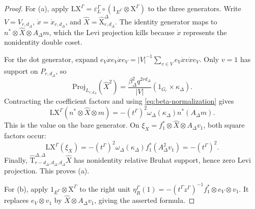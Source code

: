 \documentclass[12pt]{amsart}
\numberwithin{itemcounter}{subsection}
\theoremstyle{plain}
\theoremstyle{definition}
\theoremstyle{remark}
\numberwithin{equation}{section}
\def\LX{\mathrm{LX}}
\def\Proj{\mathrm{Proj}}
\begin{document}
\begin{proof}
For (a), apply
\(\LX^\Gamma=\varepsilon_L^\Gamma\circ(1_{E^\Gamma}\otimes\mathrm X^\Gamma)\)
to the three generators.  Write \(V=V_{r,d_\Delta}\),
\(\dot x=\dot x_{r,d_\Delta}\), and
\(\widehat X=\widehat{\mathrm X}^\Delta_{r,d_\Delta}\).
The identity generator maps to
\(n^*\otimes\widehat X\otimes A_\Delta m\), which the Levi projection
kills because \(\dot x\) represents the nonidentity double coset.

For the dot generator, expand
\(e_V\dot x e_V\dot x e_V
=|V|^{-1}\sum_{v\in V}e_V\dot x v\dot x e_V\).
Only \(v=1\) has support on \(P_{r,d_\Delta}\), so
\[
 \Proj_{L_{r,d_\Delta}}(\widehat X^2)
 =\frac{\beta_\Delta^2q^{2rd_\Delta}}{|V|}
       (1_{G_r}\times\kappa_\Delta).
\]
Contracting the coefficient factors and using
\eqref{eq:beta-normalization} gives
\[
 \LX^\Gamma(n^*\otimes\widehat X\otimes m)
 =-(t^\Gamma)^2\omega_\Delta(\kappa_\Delta)n^*(A_\Delta m).
\]
This is the value on the bare generator.  On
\(\xi_X=f_1^*\otimes\widehat X\otimes A_\Delta v_1\), both square
factors occur:
\[
 \LX^\Gamma(\xi_X)
 =-(t^\Gamma)^2\omega_\Delta(\kappa_\Delta)f_1^*(A_\Delta^2v_1)
 =-(t^\Gamma)^2.
\]
Finally,
\(\widehat{\mathrm T}^{\Delta,\Delta}_{r-d_\Delta,d_\Delta,d_\Delta}
\widehat X\) has nonidentity relative Bruhat support, hence zero Levi
projection.  This proves (a).

For (b), apply \(1_{E^\Gamma}\otimes\mathrm X^\Gamma\) to the right
unit \(\eta_R^\Gamma(1)=-(t^\Gamma z^\Gamma)^{-1}
f_1^*\otimes e_V\otimes v_1\).  It replaces \(e_V\otimes v_1\) by
\(\widehat X\otimes A_\Delta v_1\), giving the asserted formula.
\end{proof}
\end{document}
